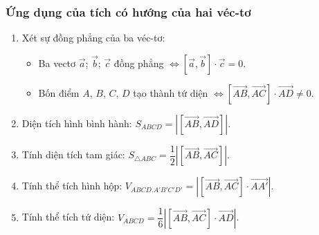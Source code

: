 \subsubsection{Ứng dụng của tích có hướng của hai véc-tơ}
	\begin{enumerate}
		\item Xét sự đồng phẳng của ba véc-tơ:
		\begin{itemize}
			\item Ba vectơ $\vec{a}$; $\vec{b}$; $\vec{c}$ đồng phẳng $\Leftrightarrow \left[ \vec{a},\vec{b} \right]\cdot \vec{c}=0$.
			\item Bốn điểm $A$, $B$, $C$, $D$ tạo thành tứ diện $\Leftrightarrow \left[ \vec{AB},\vec{AC} \right]\cdot \vec{AD}\ne 0$.
		\end{itemize}
		\item Diện tích hình bình hành: $S_{ABCD}=\left| \left[ \vec{AB},\vec{AD} \right] \right|$.
		\item Tính diện tích tam giác: $S_{\triangle ABC}=\dfrac{1}{2}\left| \left[ \vec{AB},\vec{AC} \right] \right|$.
		\item Tính thể tích hình hộp: $V_{ABCD.A'B'C'D'}=\left| \left[ \vec{AB},\vec{AC} \right]\cdot\vec{AA'} \right|$.
		\item Tính thể tích tứ diện: $V_{ABCD}=\dfrac{1}{6}\left| \left[ \vec{AB},\vec{AC} \right]\cdot \vec{AD} \right|$.
	\end{enumerate} 

